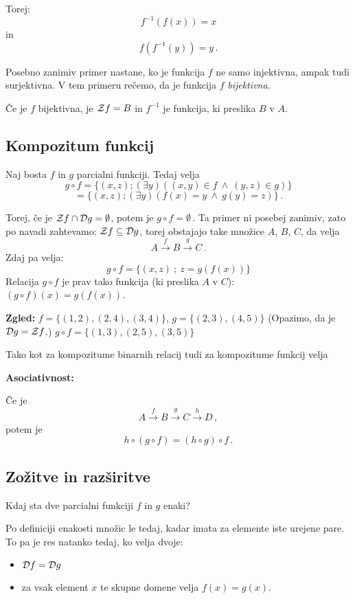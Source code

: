 \documentclass[11pt,paper=b5,footinclude,headinclude]{scrbook} %
\def\inn {{~\wedge~}}
\begin{document}
Torej: $$f^{-1}(f(x)) = x$$
in
$$f(f^{-1}(y)) = y\,.$$

Posebno zanimiv primer nastane, ko je funkcija $f$ ne samo injektivna, ampak tudi surjektivna. V tem primeru rečemo, da je funkcija $f$ {\em bijektivna}.

Če je $f$ bijektivna, je ${\cal Z}f = B$ in $f^{-1}$ je funkcija, ki preslika $B$ v $A$.


%

\subsection{Kompozitum funkcij}

Naj bosta $f$ in $g$ parcialni funkciji. Tedaj velja
$$g\circ f = \{(x,z);(\exists y)((x,y)\in f\inn (y,z)\in g)\}$$
$$= \{(x,z);(\exists y)(f(x) = y \inn g(y) = z)\}\,.$$

Torej, če je ${\cal Z}f\cap {\cal D}g = \emptyset$, potem je $g\circ f = \emptyset\,.$ Ta primer ni posebej zanimiv, zato po navadi zahtevamo: ${\cal Z}f\subseteq {\cal D}g$, torej obstajajo take množice $A$, $B$, $C$, da velja $$A\overset{f}{\to} B\overset{g}{\to} C\,.$$ Zdaj pa velja:
$$g\circ f = \{(x,z)~;~z = g(f(x))\}$$
Relacija $g\circ f$ je prav tako funkcija (ki preslika $A$ v $C$): $(g\circ f)(x) = g(f(x))$.

\bigskip
\textbf{ Zgled:} $f = \{(1,2),(2,4),(3,4)\}$, $g = \{(2,3),(4,5)\}$
(Opazimo, da je ${\cal D}g = {\cal Z}f$.)
$g\circ f = \{(1,3),(2,5), (3,5)\}$

\bigskip
Tako kot za kompozitume binarnih relacij tudi za kompozitume funkcij velja

\medskip
\textbf{ Asociativnost:}

Če je
$$A\overset{f}{\to} B\overset{g}{\to} C\overset{h}{\to} D\,,$$
potem je
$$h\circ (g\circ f) = (h\circ g)\circ f\,.$$

\subsection{Zožitve in razširitve}
Kdaj sta dve parcialni funkciji $f$ in $g$ enaki?

Po definiciji enakosti množic le tedaj, kadar imata za elemente iste urejene pare. To pa je res natanko tedaj, ko velja dvoje:
\begin{itemize}
  \item ${\cal D}f = {\cal D}g$
  \item za vsak element $x$ te skupne domene velja $f(x) = g(x)$.
\end{itemize}
\end{document}

